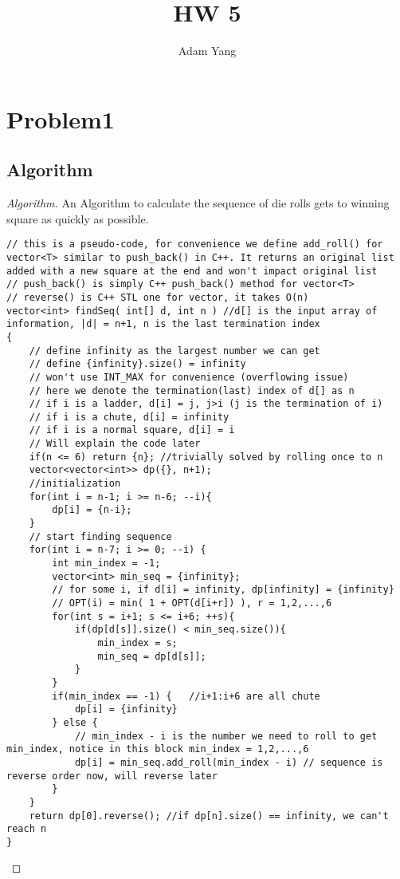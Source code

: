 \documentclass[openany]{article}
\begin{document}
\title{HW 5}
\author{Adam Yang}
\maketitle




\section*{Problem1}

\subsection*{Algorithm}
\begin{proof}[Algorithm]{}
		\renewcommand{\qedsymbol}{}
		An Algorithm to calculate the sequence of die rolls gets to winning square as quickly as possible.
		\begin{lstlisting}[basicstyle=\fontsize{8}{9}\selectfont\ttfamily]
// this is a pseudo-code, for convenience we define add_roll() for vector<T> similar to push_back() in C++. It returns an original list added with a new square at the end and won't impact original list
// push_back() is simply C++ push_back() method for vector<T>
// reverse() is C++ STL one for vector, it takes O(n)
vector<int> findSeq( int[] d, int n ) //d[] is the input array of information, |d| = n+1, n is the last termination index
{
    // define infinity as the largest number we can get
    // define {infinity}.size() = infinity
    // won't use INT_MAX for convenience (overflowing issue)
    // here we denote the termination(last) index of d[] as n
    // if i is a ladder, d[i] = j, j>i (j is the termination of i)
    // if i is a chute, d[i] = infinity
    // if i is a normal square, d[i] = i
    // Will explain the code later
    if(n <= 6) return {n}; //trivially solved by rolling once to n
    vector<vector<int>> dp({}, n+1);
    //initialization
    for(int i = n-1; i >= n-6; --i){
        dp[i] = {n-i};
    }
    // start finding sequence
    for(int i = n-7; i >= 0; --i) {
        int min_index = -1;
        vector<int> min_seq = {infinity};
        // for some i, if d[i] = infinity, dp[infinity] = {infinity}
        // OPT(i) = min( 1 + OPT(d[i+r]) ), r = 1,2,...,6
        for(int s = i+1; s <= i+6; ++s){
            if(dp[d[s]].size() < min_seq.size()){
                min_index = s;
                min_seq = dp[d[s]];
            }
        }
        if(min_index == -1) {   //i+1:i+6 are all chute
            dp[i] = {infinity}
        } else {
            // min_index - i is the number we need to roll to get min_index, notice in this block min_index = 1,2,...,6
            dp[i] = min_seq.add_roll(min_index - i) // sequence is reverse order now, will reverse later
        }
    }
    return dp[0].reverse(); //if dp[n].size() == infinity, we can't reach n
}
		\end{lstlisting} 
\end{proof}
\end{document}
